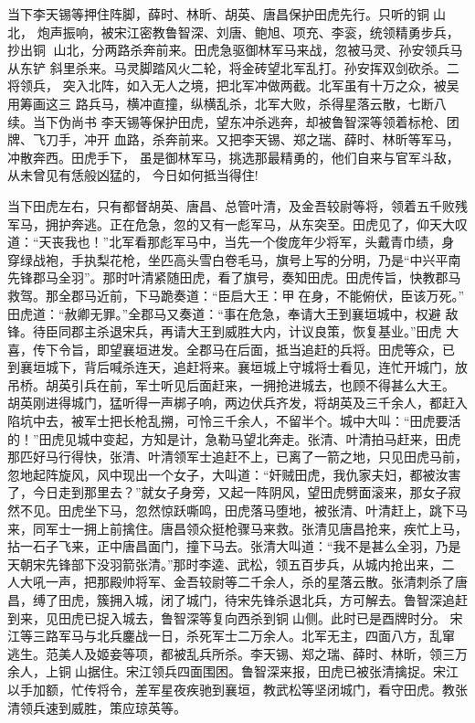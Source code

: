 当下李天锡等押住阵脚，薛时、林昕、胡英、唐昌保护田虎先行。只听的铜山北，
炮声振响，被宋江密教鲁智深、刘唐、鲍旭、项充、李衮，统领精勇步兵，抄出铜
山北，分两路杀奔前来。田虎急驱御林军马来战，忽被马灵、孙安领兵马从东铲
斜里杀来。马灵脚踏风火二轮，将金砖望北军乱打。孙安挥双剑砍杀。二将领兵，
突入北阵，如入无人之境，把北军冲做两截。北军虽有十万之众，被吴用筹画这三
路兵马，横冲直撞，纵横乱杀，北军大败，杀得星落云散，七断八续。当下伪尚书
李天锡等保护田虎，望东冲杀逃奔，却被鲁智深等领着标枪、团牌、飞刀手，冲开
血路，杀奔前来。又把李天锡、郑之瑞、薛时、林昕等军马，冲散奔西。田虎手下，
虽是御林军马，挑选那最精勇的，他们自来与官军斗敌，从未曾见有恁般凶猛的，
今日如何抵当得住!

当下田虎左右，只有都督胡英、唐昌、总管叶清，及金吾较尉等将，领着五千败残
军马，拥护奔逃。正在危急，忽的又有一彪军马，从东突至。田虎见了，仰天大叹
道：“天丧我也！”北军看那彪军马中，当先一个俊庞年少将军，头戴青巾绩，身
穿绿战袍，手执梨花枪，坐匹高头雪白卷毛马，旗号上写的分明，乃是“中兴平南
先锋郡马全羽”。那时叶清紧随田虎，看了旗号，奏知田虎。田虎传旨，快教郡马
救驾。那全郡马近前，下马跪奏道：“臣启大王：甲在身，不能俯伏，臣该万死。”
田虎道：“赦卿无罪。”全郡马又奏道：“事在危急，奉请大王到襄垣城中，权避
敌锋。待臣同郡主杀退宋兵，再请大王到威胜大内，计议良策，恢复基业。”田虎
大喜，传下令旨，即望襄垣进发。全郡马在后面，抵当追赶的兵将。田虎等众，已
到襄垣城下，背后喊杀连天，追赶将来。襄垣城上守城将士看见，连忙开城门，放
吊桥。胡英引兵在前，军士听见后面赶来，一拥抢进城去，也顾不得甚么大王。
胡英刚进得城门，猛听得一声梆子响，两边伏兵齐发，将胡英及三千余人，都赶入
陷坑中去，被军士把长枪乱搠，可怜三千余人，不留半个。城中大叫：“田虎要活
的！”田虎见城中变起，方知是计，急勒马望北奔走。张清、叶清拍马赶来，田虎
那匹好马行得快，张清、叶清领军士追赶不上，已离了一箭之地，只见田虎马前，
忽地起阵旋风，风中现出一个女子，大叫道：“奸贼田虎，我仇家夫妇，都被汝害
了，今日走到那里去？”就女子身旁，又起一阵阴风，望田虎劈面滚来，那女子寂
然不见。田虎坐下马，忽然惊跃嘶鸣，田虎落马堕地，被张清、叶清赶上，跳下马
来，同军士一拥上前擒住。唐昌领众挺枪骤马来救。张清见唐昌抢来，疾忙上马，
拈一石子飞来，正中唐昌面门，撞下马去。张清大叫道：“我不是甚么全羽，乃是
天朝宋先锋部下没羽箭张清。”那时李逵、武松，领五百步兵，从城内抢出来，二
人大吼一声，把那殿帅将军、金吾较尉等二千余人，杀的星落云散。张清刺杀了唐
昌，缚了田虎，簇拥入城，闭了城门，待宋先锋杀退北兵，方可解去。鲁智深追赶
到来，见田虎已捉入城去，鲁智深等复向西杀到铜山侧。此时已是酉牌时分。
宋江等三路军马与北兵鏖战一日，杀死军士二万余人。北军无主，四面八方，乱窜
逃生。范美人及姬妾等项，都被乱兵所杀。李天锡、郑之瑞、薛时、林昕，领三万
余人，上铜山据住。宋江领兵四面围困。鲁智深来报，田虎已被张清擒捉。宋江
以手加额，忙传将令，差军星夜疾驰到襄垣，教武松等坚闭城门，看守田虎。教张
清领兵速到威胜，策应琼英等。

